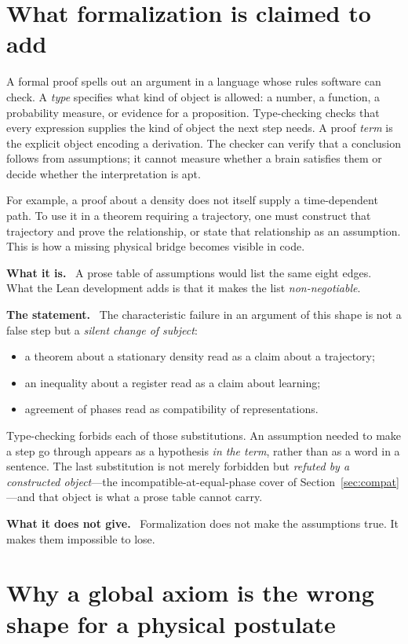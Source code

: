 \documentclass[11pt]{article}
\newcommand{\what}{\par\smallskip\noindent\textbf{What it is.}\ }
\newcommand{\statement}{\par\smallskip\noindent\textbf{The statement.}\ }
\newcommand{\scope}{\par\smallskip\noindent\textbf{What it does not give.}\ }
\begin{document}
\section{What formalization is claimed to add}

A formal proof spells out an argument in a language whose rules software can
check. A \emph{type} specifies what kind of object is allowed: a number, a
function, a probability measure, or evidence for a proposition. Type-checking
checks that every expression supplies the kind of object the next step needs.
A proof \emph{term} is the explicit object encoding a derivation. The checker
can verify that a conclusion follows from assumptions; it cannot measure
whether a brain satisfies them or decide whether the interpretation is apt.

For example, a proof about a density does not itself supply a time-dependent
path. To use it in a theorem requiring a trajectory, one must construct that
trajectory and prove the relationship, or state that relationship as an
assumption. This is how a missing physical bridge becomes visible in code.

\what
A prose table of assumptions would list the same eight edges. What the Lean
development adds is that it makes the list \emph{non-negotiable}.

\statement
The characteristic failure in an argument of this shape is not a false step but
a \emph{silent change of subject}:
\begin{itemize}[leftmargin=*,noitemsep]
\item a theorem about a stationary density read as a claim about a trajectory;
\item an inequality about a register read as a claim about learning;
\item agreement of phases read as compatibility of representations.
\end{itemize}
Type-checking forbids each of those substitutions. An assumption needed to make
a step go through appears as a hypothesis \emph{in the term}, rather than as a
word in a sentence. The last substitution is not merely forbidden but
\emph{refuted by a constructed object}---the incompatible-at-equal-phase cover
of Section~\ref{sec:compat}---and that object is what a prose table cannot
carry.

\scope
Formalization does not make the assumptions true. It makes them impossible to
lose.

\section{Why a global axiom is the wrong shape for a physical postulate}
\label{sec:soundness}
\end{document}
